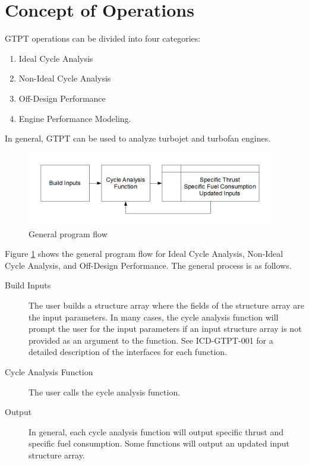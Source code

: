 \documentclass{article}
\begin{document}
\section{Concept of Operations}
GTPT operations can be divided into four categories:
\begin{enumerate}
\item Ideal Cycle Analysis
\item Non-Ideal Cycle Analysis
\item Off-Design Performance
\item Engine Performance Modeling.
\end{enumerate}
In general, GTPT can be used to analyze turbojet and turbofan engines.

\begin{figure}[h]
  \centering
  \includegraphics[width=4.25in]{figure-cycle-analysis-flowchart.png}
  \caption{General program flow}
  \label{fig:cycleflow}
\end{figure}

Figure \ref{fig:cycleflow} shows the general program flow for Ideal
Cycle Analysis, Non-Ideal Cycle Analysis, and Off-Design Performance.
The general process is as follows.
\begin{description}
\item[Build Inputs] The user builds a structure array where the fields
  of the structure array are the input parameters.  In many cases, the
  cycle analysis function will prompt the user for the input
  parameters if an input structure array is not provided as an
  argument to the function.  See ICD-GTPT-001 for a detailed
  description of the interfaces for each function.
\item[Cycle Analysis Function] The user calls the cycle analysis
  function.
\item[Output] In general, each cycle analysis function will output
  specific thrust and specific fuel consumption.  Some functions will
  output an updated input structure array.
\end{description}
\end{document}
